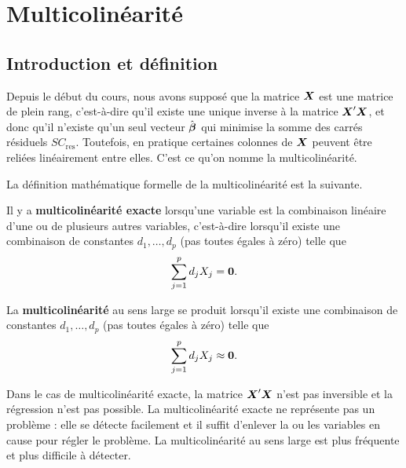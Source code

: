 

\chapter{Multicolinéarité}
\label{sec:Multicolinéarité}

\section{Introduction et définition}
Depuis le début du cours, nous avons supposé que la matrice  $\mbox{\boldmath$X$\unboldmath}$ est une matrice de plein rang, c'est-à-dire qu'il existe une unique inverse à la matrice $\mbox{\boldmath$X$\unboldmath}'\mbox{\boldmath$X$\unboldmath}$, et donc qu'il n'existe qu'un seul vecteur $\hat{\mbox{\boldmath$\beta$}}$ qui minimise la somme des carrés résiduels $SC_{\text{res}}$. Toutefois, en pratique certaines colonnes de $\mbox{\boldmath$X$\unboldmath}$ peuvent être reliées linéairement entre elles. C'est ce qu'on nomme la  multicolinéarité.

La définition mathématique formelle de la multicolinéarité est la suivante.
\begin{defn}\label{def:multi}
Il y a \textbf{multicolinéarité exacte} lorsqu'une variable est la combinaison linéaire d'une ou de plusieurs autres variables, c'est-à-dire  lorsqu'il existe une
 combinaison de constantes $d_1,\ldots,d_p$ (pas toutes \'egales
 \`a z\'ero) telle que
 $$\sum_{j=1}^pd_jX_j=\mbox{\boldmath$0$\unboldmath}.$$
\end{defn}

\begin{defn}
La \textbf{multicolinéarité} au sens large se produit lorsqu'il existe une
combinaison de constantes $d_1,\ldots,d_p$ (pas toutes \'egales
 \`a z\'ero) telle que
 $$\sum_{j=1}^pd_jX_j\approx \mbox{\boldmath$0$\unboldmath}.$$
 \end{defn}
Dans le cas de multicolinéarité exacte, la matrice $\mbox{\boldmath$X$\unboldmath}'\mbox{\boldmath$X$\unboldmath}$ n'est pas inversible et la régression n'est pas possible.
La multicolinéarité exacte ne représente pas un problème : elle se détecte facilement et il suffit d'enlever la ou les variables en cause pour régler le problème.
La multicolinéarité au sens large est plus fréquente et plus difficile à détecter.

